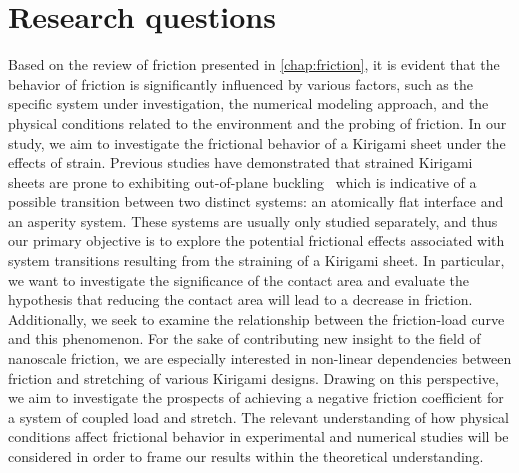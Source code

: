 



\section{Research questions}\label{sec:research_questions}
Based on the review of friction presented in \cref{chap:friction}, it is evident that the behavior of friction is significantly influenced by various factors, such as the specific system under investigation, the numerical modeling approach, and the physical conditions related to the environment and the probing of friction. In our study, we aim to investigate the frictional behavior
of a Kirigami sheet under the effects of strain. Previous studies have
demonstrated that strained Kirigami sheets are prone to exhibiting out-of-plane buckling~\cite{PhysRevLett.121.255304, PhysRevResearch.2.042006} which is indicative of a possible transition between two distinct systems: an atomically flat interface and an asperity system. These systems are usually only studied
separately, and thus our primary objective is to explore the potential frictional effects associated with system transitions resulting from the straining of a Kirigami sheet. In particular, we want to investigate the significance of the contact area and evaluate the hypothesis that reducing the contact area will lead to a decrease in friction. Additionally, we seek to examine the relationship between the friction-load curve and this phenomenon. For the sake of contributing new insight to the field of nanoscale
friction, we are especially interested in non-linear dependencies between
friction and stretching of various Kirigami designs. Drawing on this
perspective, we aim to investigate the prospects of achieving a negative friction coefficient for a system of coupled load and stretch. The relevant
understanding of how physical conditions affect frictional behavior in
experimental and numerical studies will be considered in order to frame our
results within the theoretical understanding.

